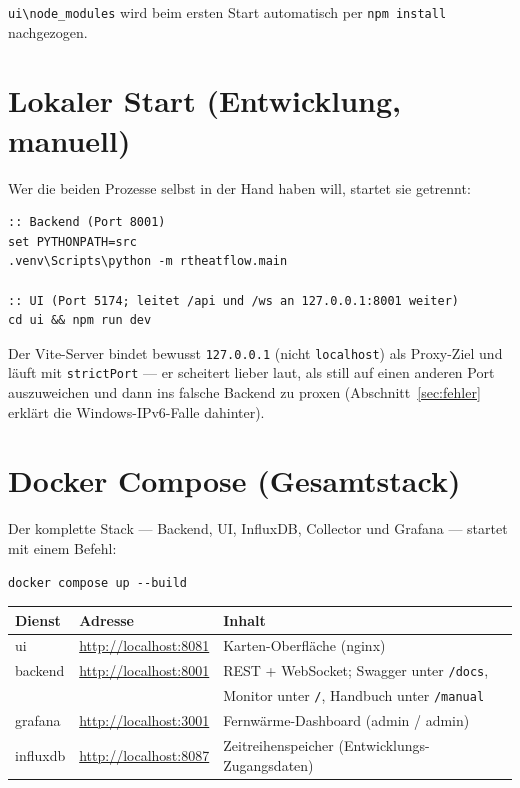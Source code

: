 \documentclass[11pt,a4paper,parskip=half]{scrreprt}
\newcommand{\api}[1]{\texttt{#1}}
\begin{document}
\texttt{ui\textbackslash node\_modules} wird beim ersten Start automatisch per
\texttt{npm install} nachgezogen.

\section{Lokaler Start (Entwicklung, manuell)}

Wer die beiden Prozesse selbst in der Hand haben will, startet sie getrennt:

\begin{lstlisting}
:: Backend (Port 8001)
set PYTHONPATH=src
.venv\Scripts\python -m rtheatflow.main

:: UI (Port 5174; leitet /api und /ws an 127.0.0.1:8001 weiter)
cd ui && npm run dev
\end{lstlisting}

Der Vite-Server bindet bewusst \texttt{127.0.0.1} (nicht \texttt{localhost}) als
Proxy-Ziel und läuft mit \texttt{strictPort} --- er scheitert lieber laut, als
still auf einen anderen Port auszuweichen und dann ins falsche Backend zu
proxen (Abschnitt~\ref{sec:fehler} erklärt die Windows-IPv6-Falle dahinter).

\section{Docker Compose (Gesamtstack)}

Der komplette Stack --- Backend, UI, InfluxDB, Collector und Grafana --- startet
mit einem Befehl:

\begin{lstlisting}
docker compose up --build
\end{lstlisting}

{\small
\begin{center}
\begin{tabular}{@{}lll@{}}
\toprule
Dienst & Adresse & Inhalt \\
\midrule
ui       & \url{http://localhost:8081} & Karten-Oberfläche (nginx) \\
backend  & \url{http://localhost:8001} & REST + WebSocket; Swagger unter \api{/docs}, \\
         &                             & Monitor unter \api{/}, Handbuch unter \api{/manual} \\
grafana  & \url{http://localhost:3001} & Fernwärme-Dashboard (admin / admin) \\
influxdb & \url{http://localhost:8087} & Zeitreihenspeicher (Entwicklungs-Zugangsdaten) \\
\bottomrule
\end{tabular}
\end{center}}
\end{document}
